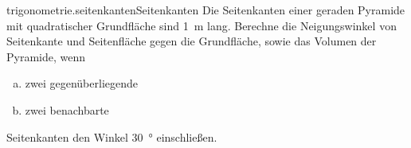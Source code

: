 \begin{exercise}{trigonometrie.seitenkanten}{Seitenkanten}
  \ifproblem\problem
    Die Seitenkanten einer geraden Pyramide mit quadratischer
    Grundfläche sind \SI{1}{\metre} lang. Berechne die
    Neigungswinkel von Seitenkante und Seitenfläche gegen
    die Grundfläche, sowie das Volumen der Pyramide, wenn
    \begin{enumerate}[a)]
      \item zwei gegenüberliegende
      \item zwei benachbarte
    \end{enumerate}
    Seitenkanten den Winkel \SI{30}{\degree} einschließen.
  \fi
\end{exercise}
